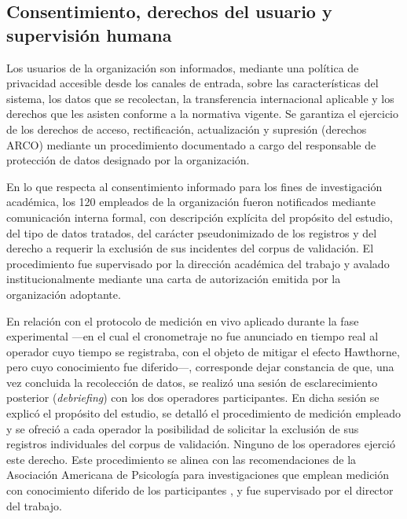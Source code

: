 \subsection{Consentimiento, derechos del usuario y supervisión humana}\label{subsec:consentimiento-derechos}

Los usuarios de la organización son informados, mediante una política de privacidad accesible desde los canales de entrada, sobre las características del sistema, los datos que se recolectan, la transferencia internacional aplicable y los derechos que les asisten conforme a la normativa vigente. Se garantiza el ejercicio de los derechos de acceso, rectificación, actualización y supresión (derechos ARCO) mediante un procedimiento documentado a cargo del responsable de protección de datos designado por la organización.

En lo que respecta al consentimiento informado para los fines de investigación académica, los 120 empleados de la organización fueron notificados mediante comunicación interna formal, con descripción explícita del propósito del estudio, del tipo de datos tratados, del carácter pseudonimizado de los registros y del derecho a requerir la exclusión de sus incidentes del corpus de validación. El procedimiento fue supervisado por la dirección académica del trabajo y avalado institucionalmente mediante una carta de autorización emitida por la organización adoptante.

En relación con el protocolo de medición en vivo aplicado durante la fase experimental ---en el cual el cronometraje no fue anunciado en tiempo real al operador cuyo tiempo se registraba, con el objeto de mitigar el efecto Hawthorne, pero cuyo conocimiento fue diferido---, corresponde dejar constancia de que, una vez concluida la recolección de datos, se realizó una sesión de esclarecimiento posterior (\textit{debriefing}) con los dos operadores participantes. En dicha sesión se explicó el propósito del estudio, se detalló el procedimiento de medición empleado y se ofreció a cada operador la posibilidad de solicitar la exclusión de sus registros individuales del corpus de validación. Ninguno de los operadores ejerció este derecho. Este procedimiento se alinea con las recomendaciones de la Asociación Americana de Psicología para investigaciones que emplean medición con conocimiento diferido de los participantes \parencite{APA2017}, y fue supervisado por el director del trabajo.

